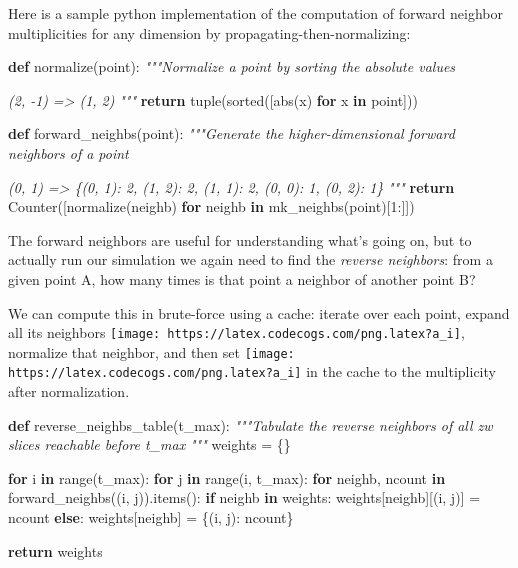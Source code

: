 \documentclass[]{article}
\newenvironment{Shaded}{}{}
\newcommand{\BuiltInTok}[1]{#1}
\newcommand{\CommentTok}[1]{\textcolor[rgb]{0.38,0.63,0.69}{\textit{#1}}}
\newcommand{\ControlFlowTok}[1]{\textcolor[rgb]{0.00,0.44,0.13}{\textbf{#1}}}
\newcommand{\DecValTok}[1]{\textcolor[rgb]{0.25,0.63,0.44}{#1}}
\newcommand{\KeywordTok}[1]{\textcolor[rgb]{0.00,0.44,0.13}{\textbf{#1}}}
\newcommand{\NormalTok}[1]{#1}
\newcommand{\OperatorTok}[1]{\textcolor[rgb]{0.40,0.40,0.40}{#1}}
\begin{document}
Here is a sample python implementation of the computation of forward neighbor
multiplicities for any dimension by propagating-then-normalizing:

\begin{Shaded}
\begin{Highlighting}[]
\KeywordTok{def}\NormalTok{ normalize(point):}
    \CommentTok{"""Normalize a point by sorting the absolute values}

\CommentTok{    (2, {-}1)}
\CommentTok{    => (1, 2)}
\CommentTok{    """}
    \ControlFlowTok{return} \BuiltInTok{tuple}\NormalTok{(}\BuiltInTok{sorted}\NormalTok{([}\BuiltInTok{abs}\NormalTok{(x) }\ControlFlowTok{for}\NormalTok{ x }\KeywordTok{in}\NormalTok{ point]))}

\KeywordTok{def}\NormalTok{ forward\_neighbs(point):}
    \CommentTok{"""Generate the higher{-}dimensional forward neighbors of a point}

\CommentTok{    (0, 1)}
\CommentTok{    => \{(0, 1): 2, (1, 2): 2, (1, 1): 2, (0, 0): 1, (0, 2): 1\}}
\CommentTok{    """}
    \ControlFlowTok{return}\NormalTok{ Counter([normalize(neighb) }\ControlFlowTok{for}\NormalTok{ neighb }\KeywordTok{in}\NormalTok{ mk\_neighbs(point)[}\DecValTok{1}\NormalTok{:]])}
\end{Highlighting}
\end{Shaded}

The forward neighbors are useful for understanding what's going on, but to
actually run our simulation we again need to find the \emph{reverse neighbors}:
from a given point A, how many times is that point a neighbor of another point
B?

We can compute this in brute-force using a cache: iterate over each point,
expand all its neighbors
\texttt{[image: https://latex.codecogs.com/png.latex?a\_i]}, normalize that
neighbor, and then set
\texttt{[image: https://latex.codecogs.com/png.latex?a\_i]} in the cache to the
multiplicity after normalization.

\begin{Shaded}
\begin{Highlighting}[]
\KeywordTok{def}\NormalTok{ reverse\_neighbs\_table(t\_max):}
    \CommentTok{"""Tabulate the reverse neighbors of all zw slices reachable before t\_max}
\CommentTok{    """}
\NormalTok{    weights }\OperatorTok{=}\NormalTok{ \{\}}

    \ControlFlowTok{for}\NormalTok{ i }\KeywordTok{in} \BuiltInTok{range}\NormalTok{(t\_max):}
        \ControlFlowTok{for}\NormalTok{ j }\KeywordTok{in} \BuiltInTok{range}\NormalTok{(i, t\_max):}
            \ControlFlowTok{for}\NormalTok{ neighb, ncount }\KeywordTok{in}\NormalTok{ forward\_neighbs((i, j)).items():}
                \ControlFlowTok{if}\NormalTok{ neighb }\KeywordTok{in}\NormalTok{ weights:}
\NormalTok{                    weights[neighb][(i, j)] }\OperatorTok{=}\NormalTok{ ncount}
                \ControlFlowTok{else}\NormalTok{:}
\NormalTok{                    weights[neighb] }\OperatorTok{=}\NormalTok{ \{(i, j): ncount\}}

    \ControlFlowTok{return}\NormalTok{ weights}
\end{Highlighting}
\end{Shaded}
\end{document}
